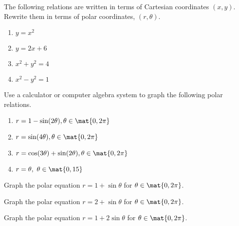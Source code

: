 \begin{ex} The following relations are written in terms of Cartesian coordinates $(x, y)$. Rewrite them in terms of polar coordinates, $(r, \theta)$.

\begin{enumerate}
\item $y=x^{2}$

\item $y=2x+6$

\item $x^{2}+y^{2}=4$

\item $x^{2}-y^{2}=1$
\end{enumerate}
\end{ex}

\begin{ex} Use a calculator or computer algebra system to graph the following
polar relations.

\begin{enumerate}
\item $r=1-\sin (2\theta) ,\theta \in \mat{0,2\pi} $

\item $r=\sin (4\theta) ,\theta \in \mat{0,2\pi} $

\item $r=\cos (3\theta) +\sin (2\theta) ,\theta
\in \mat{0,2\pi} $

\item $r=\theta ,\ \theta \in \mat{0,15} $
\end{enumerate}
\end{ex}

\begin{ex} Graph the polar equation $r=1+\sin \theta $ for $\theta \in \mat{0,2\pi}$.
\end{ex}

\begin{ex} Graph the polar equation $r=2+\sin \theta $ for $\theta \in \mat{0,2\pi}$.
\end{ex}

\begin{ex} Graph the polar equation $r=1+2\sin \theta $ for $\theta \in \mat{0,2\pi}$.
\end{ex}

